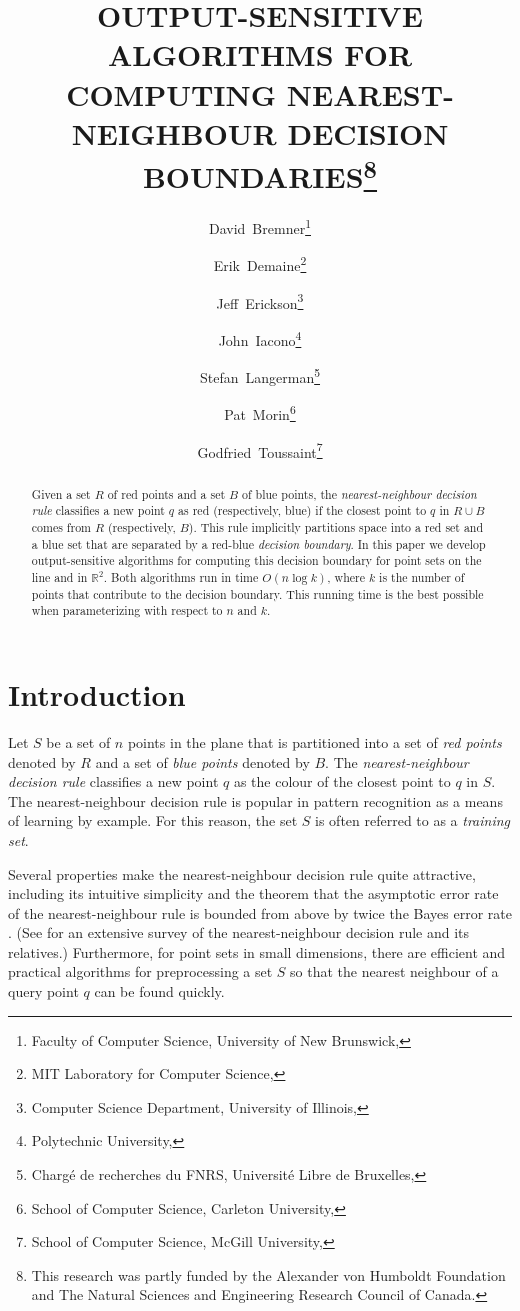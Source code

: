 \documentclass[lotsofwhite,charterfonts]{patmorin}
\title{\MakeUppercase{Output-Sensitive Algorithms for Computing 
	Nearest-Neighbour Decision Boundaries}\thanks{%
	This research was partly funded by the Alexander von Humboldt
	Foundation and The Natural Sciences and Engineering Research
	Council of Canada.}}
\author{David~Bremner\thanks{Faculty of Computer Science,
	University of New Brunswick,
	\email{bremner@unb.ca}} \and
	Erik~Demaine\thanks{MIT Laboratory for Computer Science,
       	\email{edemaine@mit.edu}}  \and
	Jeff~Erickson\thanks{Computer Science Department, University of Illinois,
	\email{jeffe@cs.uiuc.edu}} \and
	John~Iacono\thanks{Polytechnic University, 
	\email{jiacono@poly.edu}} \and
	Stefan~Langerman\thanks{Charg\'e de recherches du FNRS, Universit\'e Libre de
	Bruxelles, 
	\email{stefan.langerman@ulb.ac.be}} \and
	Pat~Morin\thanks{School of Computer Science, Carleton University,
	\email{morin@cs.carleton.ca}} \and
	Godfried~Toussaint\thanks{School of Computer Science, McGill University,
	\email{godfried@cs.mcgill.ca}}
}
\date{}
\begin{document}
\maketitle

\begin{abstract} 
Given a set $R$ of red points and a set $B$ of blue points, the
\emph{nearest-neighbour decision rule} classifies a new point $q$ as
red (respectively, blue) if the closest point to $q$ in $R\cup B$
comes from $R$ (respectively, $B$).  This rule implicitly partitions
space into a red set and a blue set that are separated by a red-blue
\emph{decision boundary}.  In this paper we develop output-sensitive
algorithms for computing this decision boundary for point sets on the
line and in $\mathbb{R}^2$.  Both algorithms run in time $O(n\log k)$,
where $k$ is the number of points that contribute to the  decision
boundary.  This running time is the best possible when parameterizing
with respect to $n$ and $k$.  
\end{abstract}

\section{Introduction}

Let $S$ be a set of $n$ points in the plane that is partitioned into a
set of \emph{red points} denoted by $R$ and a set of \emph{blue
points} denoted by $B$.  The \emph{nearest-neighbour decision rule}
classifies a new point $q$ as the colour of the closest point to $q$ in
$S$.  The nearest-neighbour decision rule is popular in pattern
recognition as a means of learning by example.  For this reason, the
set $S$ is often referred to as a \emph{training set}. 

Several properties make the nearest-neighbour decision rule quite
attractive, including its intuitive simplicity and the theorem that
the asymptotic error rate of the nearest-neighbour rule is bounded
from above by twice the Bayes error rate \cite{ch67,d81,s77}.  (See
\cite{t03} for an extensive survey of the nearest-neighbour decision
rule and its relatives.) Furthermore, for point sets in small
dimensions, there are efficient and practical algorithms for
preprocessing a set $S$ so that the nearest neighbour of a query point
$q$ can be found quickly.
\end{document}
